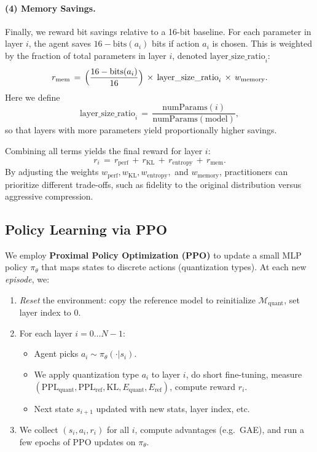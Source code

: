\documentclass{article}
\begin{document}
    \paragraph{(4) Memory Savings.}
    Finally, we reward bit savings relative to a 16-bit baseline. For each parameter in layer \(i\), the agent saves \(16 - \text{bits}(a_i)\) bits if action \(a_i\) is chosen. This is weighted by the fraction of total parameters in layer \(i\), denoted \(\text{layer\_size\_ratio}_i\):
    \begin{equation}
    	r_{\mathrm{mem}} 
    	\,=\, 
    	\Bigl(\frac{16 - \text{bits}(a_i)}{16}\Bigr)
    	\,\times\,
    	\text{layer\_size\_ratio}_i
    	\,\times\, 
    	w_{\mathrm{memory}}.
    \end{equation}
    Here we define
    \[
    \text{layer\_size\_ratio}_i 
    \,=\, 
    \frac{\text{numParams}(i)}{\text{numParams}(\text{model})},
    \]
    so that layers with more parameters yield proportionally higher savings.
        
    Combining all terms yields the final reward for layer \(i\):
    \begin{equation}
    	\label{eq:reward_final}
    	r_i 
    	\,=\,
    	r_{\mathrm{perf}} 
    	\,+\, 
    	r_{\mathrm{KL}} 
    	\,+\, 
    	r_{\mathrm{entropy}} 
    	\,+\, 
    	r_{\mathrm{mem}}.
    \end{equation}
    By adjusting the weights \(w_{\mathrm{perf}}, w_{\mathrm{KL}}, w_{\mathrm{entropy}},\) and \(w_{\mathrm{memory}}\), practitioners can prioritize different trade-offs, such as fidelity to the original distribution versus aggressive compression.
    		
	\subsection{Policy Learning via PPO}
	We employ \textbf{Proximal Policy Optimization (PPO)} \cite{ppo2017} to update a small MLP policy $\pi_\theta$ that maps states to discrete actions (quantization types). At each new \emph{episode}, we:
	\begin{enumerate}
		\item \emph{Reset} the environment: copy the reference model to reinitialize $\mathcal{M}_\text{quant}$, set layer index to 0.
		\item For each layer $i=0 \dots N-1$:
		\begin{itemize}
			\item Agent picks $a_i \sim \pi_\theta(\cdot|s_i)$.
			\item We apply quantization type $a_i$ to layer $i$, do short fine-tuning, measure $(\mathrm{PPL}_\text{quant}, \mathrm{PPL}_\text{ref}, \mathrm{KL}, E_\text{quant}, E_\text{ref})$, compute reward $r_i$.
			\item Next state $s_{i+1}$ updated with new stats, layer index, etc.
		\end{itemize}
		\item We collect $(s_i,a_i,r_i)$ for all $i$, compute advantages (e.g.\ GAE), and run a few epochs of PPO updates on $\pi_\theta$.
	\end{enumerate}
	
\end{document}
